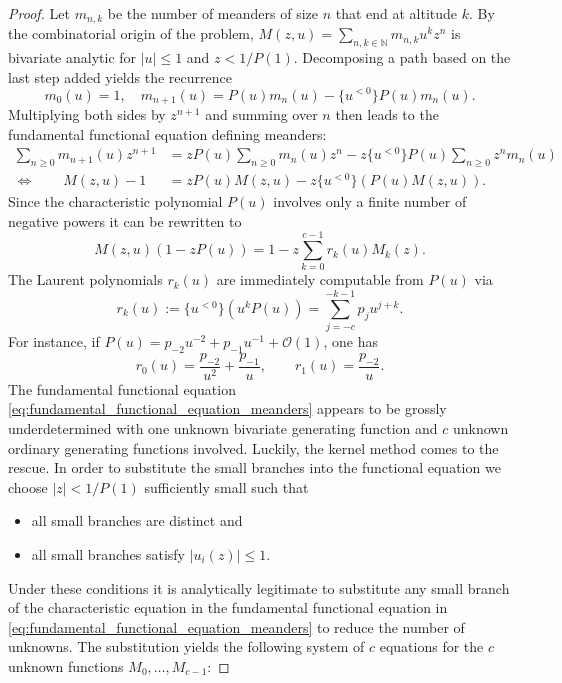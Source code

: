 \begin{proof}
  Let $m_{n,k}$ be the number of meanders of size $n$ that end at altitude $k$. 
  By the combinatorial origin of the problem, $M(z,u) = \sum_{n,k \in \mathbb{N}} m_{n,k}u^kz^n$ is bivariate analytic for $|u| \leq 1$ and $z < 1/P(1)$. 
  Decomposing a path based on the last step added yields the recurrence $$
  m_0(u) = 1, \quad m_{n+1}(u) = P(u)m_n(u) - \{u^{<0}\}P(u)m_n(u).
  $$
  Multiplying both sides by $z^{n+1}$ and summing over $n$ then leads to the fundamental functional equation defining meanders:
  \begin{equation}\label{eq:fundamental_functional_equation_meanders}
    \begin{split}
      \sum_{n \geq 0} m_{n+1}(u)z^{n+1} &= zP(u)\sum_{n \geq 0} m_n(u)z^n - z\{u^{<0}\}P(u)\sum_{n \geq 0}z^n m_n(u) \\
      \iff \qquad
      M(z,u) - 1 &= zP(u)M(z,u) - z\{u^{<0}\}(P(u)M(z,u)).
    \end{split}
  \end{equation}
  Since the characteristic polynomial $P(u)$ involves only a finite number of negative powers it can be rewritten to 
  $$
    M(z,u)(1 - zP(u)) = 1 - z\sum_{k=0}^{c-1}r_k(u)M_k(z).
  $$
  The Laurent polynomials $r_k(u)$ are immediately computable from $P(u)$ via $$
    r_k(u) := \{u^{<0}\}(u^k P(u)) = \sum_{j=-c}^{-k-1}p_j u^{j+k}.
  $$
  For instance, if $P(u) = p_{-2}u^{-2} + p_{-1}u^{-1} + \mathcal{O}(1)$, one has
  $$
    r_0(u) = \frac{p_{-2}}{u^2} + \frac{p_{-1}}{u}, \qquad
    r_1(u) = \frac{p_{-2}}{u}.
  $$
  The fundamental functional equation \eqref{eq:fundamental_functional_equation_meanders} appears to be grossly underdetermined with one unknown bivariate generating function and $c$ unknown ordinary generating functions involved. 
  Luckily, the kernel method comes to the rescue. In order to substitute the small branches into the functional equation we choose $|z| < 1/P(1)$ sufficiently small such that
  \begin{itemize}
    \item all small branches are distinct and
    \item all small branches satisfy $|u_i(z)| \leq 1$.
  \end{itemize}
  Under these conditions it is analytically legitimate to substitute any small branch of the characteristic equation in the fundamental functional equation in \eqref{eq:fundamental_functional_equation_meanders} to reduce the number of unknowns.
  The substitution yields the following system of $c$ equations for the $c$ unknown functions $M_0, \dots, M_{c-1}$:

\end{proof}
